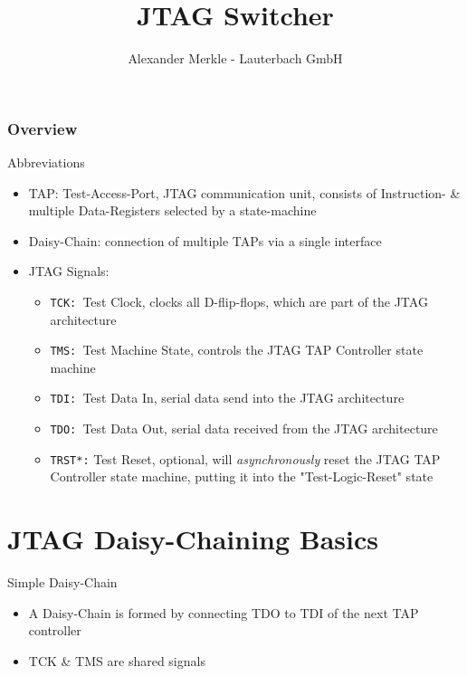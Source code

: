 \documentclass[aspectratio=169,12pt]{beamer}
\title{JTAG Switcher}
\author{Alexander Merkle - Lauterbach GmbH}
\date{\gitdate}
\begin{document}
\begin{frame}
\titlepage
\end{frame}

\begin{frame}
\frametitle{Overview}
\tableofcontents[hideallsubsections]
\end{frame}


\begin{frame}[t]{Abbreviations}
\begin{itemize}
\item TAP: Test-Access-Port, JTAG communication unit, consists of Instruction- \& multiple Data-Registers selected by a state-machine
\item Daisy-Chain: connection of multiple TAPs via a single interface
\item JTAG Signals:
\begin{itemize}
\item \texttt{TCK: }Test Clock, clocks all D-flip-flops, which are part of the JTAG architecture
\item \texttt{TMS: }Test Machine State, controls the JTAG TAP Controller state machine
\item \texttt{TDI: }Test Data In, serial data send into the JTAG architecture
\item \texttt{TDO: }Test Data Out, serial data received from the JTAG architecture
\item \texttt{TRST*:} Test Reset, optional, will \emph{asynchronously} reset the JTAG TAP Controller state machine,
putting it into the "Test-Logic-Reset" state
\end{itemize}
\end{itemize}
\end{frame}

\section{JTAG Daisy-Chaining Basics}

\begin{frame}[t]{Simple Daisy-Chain}
\begin{center}

\end{center}
\begin{itemize}
\item A Daisy-Chain is formed by connecting TDO to TDI of the next TAP controller
\item TCK \& TMS are shared signals
\end{itemize}
\end{frame}
\end{document}
